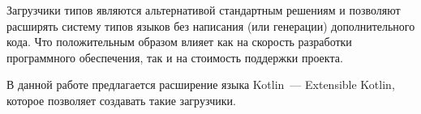 Загрузчики типов являются альтернативой стандартным решениям и позволяют расширять систему типов языков без написания (или генерации) дополнительного кода.
Что положительным образом влияет как на скорость разработки программного обеспечения, так и на стоимость поддержки проекта.

В данной работе предлагается расширение языка Kotlin~--- Extensible Kotlin, которое позволяет создавать такие загрузчики.




